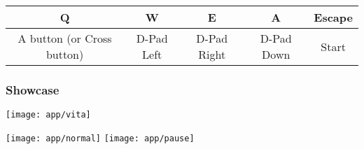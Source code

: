 \begin{table}[h]
\centering
\begin{tabular}{|c|c|c|c|c|}
\hline
Q                          & W          & E           & A          & Escape \\ \hline
A button (or Cross button) & D-Pad Left & D-Pad Right & D-Pad Down & Start  \\ \hline
\end{tabular}
\vspace{-0.5em}
\label{tab:appcontrols}
\end{table}

\subsubsection{Showcase}
\label{sec:ch4sec4subsub1}

\begin{minipage}{\linewidth}
\centering
\texttt{[image: app/vita]}
\end{minipage}

\begin{minipage}{\linewidth}
\centering
\texttt{[image: app/normal]}
\texttt{[image: app/pause]}
\end{minipage}